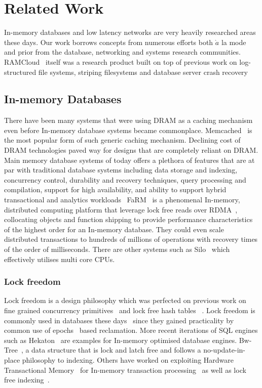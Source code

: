 
\chapter{Related Work}
In-memory databases and low latency networks are very heavily researched areas
these days. Our work borrows concepts from numerous efforts both $\grave{a}$
 la mode and prior from the database, networking and systems research communities.
RAMCloud~\cite{ramcloud} itself was a research product built on top of previous 
work on log-structured file systems, striping filesystems and database server 
crash recovery~\cite{ryan-thesis}

\section{In-memory Databases}
There have been many systems that were using DRAM as a caching mechanism even before
In-memory database systems became commonplace. Memcached~\cite{memcached-orig} is 
the most popular form of such generic caching mechanism. Declining cost of DRAM 
technologies paved way for designs that are completely reliant on DRAM. Main memory
database systems of today offers a plethora of features that are at par with traditional
database systems including data storage and indexing, concurrency control, durability and 
recovery techniques, query processing and compilation, support for high availability, and 
ability to support hybrid transactional and analytics workloads~\cite{mmdbmstutorial}
FaRM~\cite{farm} is a phenomenal In-memory, distributed computing platform that leverage lock free reads over RDMA~\cite{rdma},
collocating objects and function shipping to provide performance characteristics of the 
highest order for an In-memory database. They could even scale distributed transactions to
hundreds of millions of operations with recovery times of the order of milliseconds. There 
are other systems such as Silo~\cite{silo} which effectively utilises multi core CPUs.

\subsection{Lock freedom}
Lock freedom is a design philosophy which was perfected on previous work on fine grained concurrency 
primitives~\cite{finegrained} and lock free hash tables ~\cite{lockfreeht}. Lock freedom is commonly
used in databases these days~\cite{htm} since they gained practicality by common use of
epochs~\cite{lockfreedom} based reclamation. 
More recent iterations of SQL engines such as Hekaton~\cite{hekaton} are 
examples for In-memory optimised  database engines. Bw-Tree~\cite{bw-tree}, a 
data structure that is lock and latch free and follows a no-update-in-place philosophy to indexing.
Others have worked on exploiting Hardware Transactional Memory~\cite{htm-old}
for In-memory transaction processing~\cite{drtm} as well as lock free indexing~\cite{htm}.

